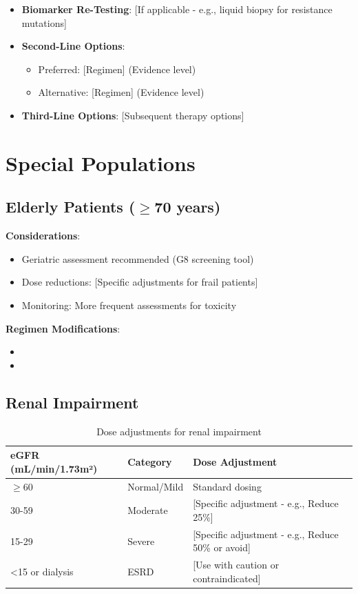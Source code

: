 \documentclass[10pt,letterpaper]{article}
\begin{document}
\begin{itemize}
\item \textbf{Biomarker Re-Testing}: [If applicable - e.g., liquid biopsy for resistance mutations]
\item \textbf{Second-Line Options}:
  \begin{itemize}
  \item Preferred: [Regimen] (Evidence level)
  \item Alternative: [Regimen] (Evidence level)
  \end{itemize}
\item \textbf{Third-Line Options}: [Subsequent therapy options]
\end{itemize}

\section{Special Populations}

\subsection{Elderly Patients ($\geq$70 years)}

\textbf{Considerations}:
\begin{itemize}
\item Geriatric assessment recommended (G8 screening tool)
\item Dose reductions: [Specific adjustments for frail patients]
\item Monitoring: More frequent assessments for toxicity
\end{itemize}

\textbf{Regimen Modifications}:
\begin{itemize}
\item [Reduced-intensity regimens if appropriate]
\item [Single-agent vs combination considerations]
\end{itemize}

\subsection{Renal Impairment}

\begin{table}[H]
\centering
\footnotesize
\begin{tabular}{lll}
\toprule
\textbf{eGFR (mL/min/1.73m²)} & \textbf{Category} & \textbf{Dose Adjustment} \\
\midrule
$\geq$60 & Normal/Mild & Standard dosing \\
30-59 & Moderate & [Specific adjustment - e.g., Reduce 25\%] \\
15-29 & Severe & [Specific adjustment - e.g., Reduce 50\% or avoid] \\
<15 or dialysis & ESRD & [Use with caution or contraindicated] \\
\bottomrule
\end{tabular}
\caption{Dose adjustments for renal impairment}
\end{table}
\end{document}
